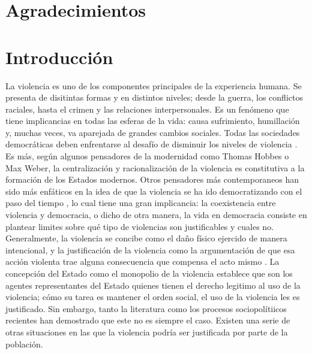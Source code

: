 \documentclass[12pt,twoside]{templates/facsothesis}
\begin{document}
\hypertarget{agradecimientos}{%
\chapter*{Agradecimientos}\label{agradecimientos}}

\hypertarget{introducciuxf3n}{%
\chapter{Introducción}\label{introducciuxf3n}}

La violencia es uno de los componentes principales de la experiencia humana. Se presenta de disitintas formas y en distintos niveles; desde la guerra, los conflictos raciales, hasta el crimen y las relaciones interpersonales. Es un fenómeno que tiene implicancias en todas las esferas de la vida: causa sufrimiento, humillación y, muchas veces, va aparejada de grandes cambios sociales. Todas las sociedades democráticas deben enfrentarse al desafío de disminuir los niveles de violencia \citep{Gerber2017, Keane2004}. Es más, según algunos pensadores de la modernidad como Thomas Hobbes o Max Weber, la centralización y racionalización de la violencia es constitutiva a la formación de los Estados modernos. Otros pensadores más contemporaneos han sido más enfáticos en la idea de que la violencia se ha ido democratizando con el paso del tiempo \citep{Keane2004}, lo cual tiene una gran implicancia: la coexistencia entre violencia y democracia, o dicho de otra manera, la vida en democracia consiste en plantear limites sobre qué tipo de violencias son justificables y cuales no. Generalmente, la violencia se concibe como el daño físico ejercido de manera intencional, y la justificación de la violencia como la argumentación de que esa acción violenta trae alguna consecuencia que compensa el acto mismo \citep{Frazer2020}. La concepción del Estado como el monopolio de la violencia \citep[1919{]}]{Weber1996} establece que son los agentes representantes del Estado quienes tienen el derecho legitimo al uso de la violencia; cómo su tarea es mantener el orden social, el uso de la violencia les es justificado. Sin embargo, tanto la literatura como los procesos sociopolítiicos recientes han demostrado que este no es siempre el caso. Existen una serie de otras situaciones en las que la violencia podría ser justificada por parte de la población.
\end{document}
